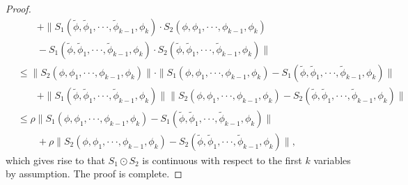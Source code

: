 \documentclass[11pt,reqno,a4paper]{amsart}
\numberwithin{equation}{section}
\begin{document}
\begin{proof}[Proof]
\begin{align*}
& \qquad +\|S_1(\tilde{\phi},\tilde{\phi}_1,\cdot \cdot \cdot,\tilde{\phi}_{k-1},\phi_{k}) \cdot S_2(\phi,\phi_1,\cdot \cdot \cdot,\phi_{k-1},\phi_{k})\\
&\qquad-S_1(\tilde{\phi},\tilde{\phi}_1,\cdot \cdot \cdot,\tilde{\phi}_{k-1},\phi_{k}) \cdot S_2(\tilde{\phi},\tilde{\phi}_1,\cdot \cdot \cdot,\tilde{\phi}_{k-1},\phi_{k})\|\\
& \le \|S_2(\phi,\phi_1,\cdot \cdot \cdot,\phi_{k-1},\phi_{k})\| \cdot \|S_1(\phi,\phi_1,\cdot \cdot \cdot,\phi_{k-1},\phi_{k})-S_1(\tilde{\phi},\tilde{\phi}_1,\cdot \cdot \cdot,\tilde{\phi}_{k-1},\phi_{k})\|
\\
&\qquad +
\|S_1(\tilde{\phi},\tilde{\phi}_1,\cdot \cdot \cdot,\tilde{\phi}_{k-1},\phi_{k})\|\|S_2(\phi,\phi_1,\cdot \cdot \cdot,\phi_{k-1},\phi_{k})-S_2(\tilde{\phi},\tilde{\phi}_1,\cdot \cdot \cdot,\tilde{\phi}_{k-1},\phi_{k})\|\\
&\le \rho \|S_1(\phi,\phi_1,\cdot \cdot \cdot,\phi_{k-1},\phi_{k})-S_1(\tilde{\phi},\tilde{\phi}_1,\cdot \cdot \cdot,\tilde{\phi}_{k-1},\phi_{k})\|\\
&\qquad+ \rho\|S_2(\phi,\phi_1,\cdot \cdot \cdot,\phi_{k-1},\phi_{k})-S_2(\tilde{\phi},\tilde{\phi}_1,\cdot \cdot \cdot,\tilde{\phi}_{k-1},\phi_{k})\|,
\end{align*}
which gives rise to that $S_1\odot S_2$ is continuous with respect to the first $k$ variables by assumption. The proof is complete.
\end{proof}
\end{document}
